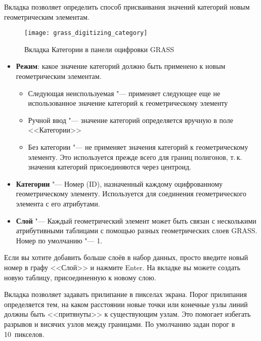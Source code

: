 
Вкладка  позволяет определить способ присваивания
значений категорий новым геометрическим элементам.

\begin{figure}[h]
 \centering
  \texttt{[image: grass\_digitizing\_category]}
  \caption{Вкладка Категории в панели оцифровки GRASS \wincaption}\label{fig:grass_digitizing_category}
 \end{figure}

\begin{itemize}[label=--]
\item \textbf{Режим}: какое значение категорий должно быть применено к
новым геометрическим элементам.
\begin{itemize}[label=--]
\item Следующая неиспользуемая "--- применяет следующее еще не
использованное значение категорий к геометрическому элементу
\item Ручной ввод "--- значение категорий определяется вручную в
поле <<Категории>>
\item Без категории "--- не применяет значения категорий к
геометрическому элементу. Это используется прежде всего для границ
полигонов, т.\,к. значения категорий присоединяются через центроид.
\end{itemize}
\item \textbf{Категории} "--- Номер (ID), назначенный каждому
оцифрованному геометрическому элементу. Используется для соединения
геометрического элемента с его атрибутами.
\item \textbf{Слой} "--- Каждый геометрический элемент может быть
связан с несколькими атрибутивными таблицами с помощью разных
геометрических слоев GRASS. Номер по умолчанию "--- 1.
\end{itemize}

\begin{Tip}\caption{\textsc{Создание дополнительного <<слоя>> GRASS в QGIS.}}
Если вы хотите добавить больше слоёв в набор данных, просто введите
новый номер в графу <<Слой>> и нажмите Enter. На вкладке 
вы можете создать новую таблицу, присоединенную к новому слою.
\end{Tip}

\label{label_settingtab}

Вкладка  позволяет задавать прилипание в пикселах
экрана. Порог прилипания определяется тем, на каком расстоянии новые
точки или конечные узлы линий должны быть <<притянуты>> к существующим
узлам. Это помогает избегать разрывов и висячих узлов между
границами. По умолчанию задан порог в 10~пикселов.

